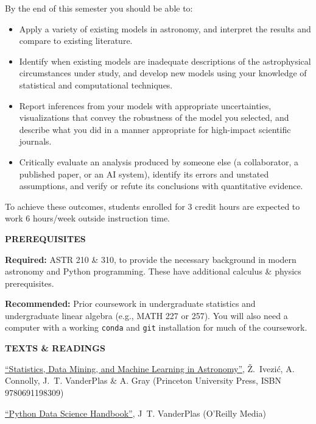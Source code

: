 By the end of this semester you should be able to:
\begin{itemize}
    \setlength\itemsep{0.05em}
    \item Apply a variety of existing models in astronomy, and interpret the
        results and compare to existing literature.
    \item Identify when existing models are inadequate descriptions of the
        astrophysical circumstances under study, and develop new models using
        your knowledge of statistical and computational techniques.
    \item Report inferences from your models with appropriate uncertainties,
        visualizations that convey the robustness of the model you selected,
        and describe what you did in a manner appropriate for high-impact
        scientific journals.
    \item Critically evaluate an analysis produced by someone else (a
        collaborator, a published paper, or an AI system), identify its
        errors and unstated assumptions, and verify or refute its conclusions
        with quantitative evidence.
\end{itemize}

To achieve these outcomes, students enrolled for 3 credit hours are expected to
work 6 hours/week outside instruction time.

{\large \bf \headerfont \color{RoyalBlue} PREREQUISITES}

{\bf Required:} ASTR 210 \& 310, to provide the necessary background in modern
astronomy and Python programming. These have additional calculus \& physics
prerequisites.

{\bf Recommended:} Prior coursework in undergraduate statistics and
undergraduate linear algebra (e.g., MATH 227 or 257). You will also need a
computer with a working \texttt{conda} and \texttt{git} installation for much
of the coursework.

{\large \bf \headerfont \color{RoyalBlue} TEXTS \& READINGS}

\vspace{-1em}
\begin{itemize}
    {
    \footnotesize
    \setlength\itemsep{0.05em}
    \item \href{https://press.princeton.edu/books/hardcover/9780691198309/statistics-data-mining-and-machine-learning-in-astronomy}{``Statistics, Data Mining, and Machine Learning in Astronomy''}, Ž.~Ivezić, A. Connolly, J.~T. VanderPlas \& A. Gray (Princeton University Press, ISBN 9780691198309)
    \item \href{https://jakevdp.github.io/PythonDataScienceHandbook/}{``Python Data Science Handbook''}, J~T. VanderPlas (O'Reilly Media)
}
\end{itemize}
\vspace{-1em}

